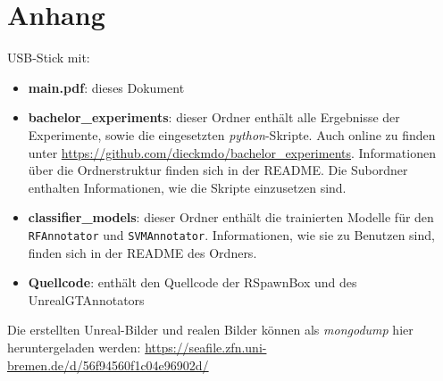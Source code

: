 \appendix
\chapter{Anhang}

USB-Stick mit:
\begin{itemize}
	\item \textbf{main.pdf}: dieses Dokument
	\item \textbf{bachelor\_experiments}: dieser Ordner enthält alle Ergebnisse der Experimente, sowie die eingesetzten \textit{python}-Skripte. Auch online zu finden unter \url{https://github.com/dieckmdo/bachelor\_experiments}. Informationen über die Ordnerstruktur finden sich in der README. Die Subordner enthalten Informationen, wie die Skripte einzusetzen sind.
	\item \textbf{classifier\_models}: dieser Ordner enthält die trainierten Modelle für den \texttt{RFAnnotator} und \texttt{SVMAnnotator}. Informationen, wie sie zu Benutzen sind, finden sich in der README des Ordners.
	\item \textbf{Quellcode}: enthält den Quellcode der RSpawnBox und des UnrealGTAnnotators
\end{itemize}








Die erstellten Unreal-Bilder und realen Bilder können als \textit{mongodump} hier heruntergeladen werden: \newline 
\url{https://seafile.zfn.uni-bremen.de/d/56f94560f1c04e96902d/}